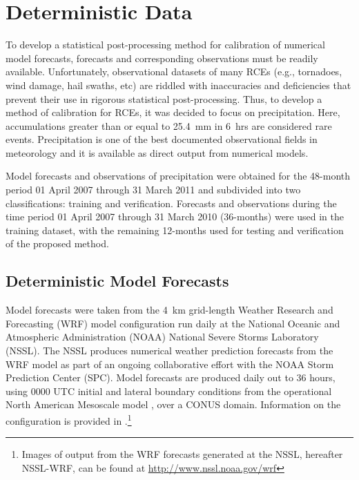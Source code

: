 

\section{Deterministic Data}
\label{ddata}

To develop a statistical post-processing method for calibration of numerical model forecasts, forecasts and corresponding observations must be readily available.
Unfortunately, observational datasets of many RCEs (e.g., tornadoes, wind damage, hail swaths, etc) are riddled with inaccuracies and deficiencies \citep{Doswell1988, Weiss2002, Trapp2006, Ortega2009} that prevent their use in rigorous statistical post-processing.
Thus, to develop a method of calibration for RCEs, it was decided to focus on precipitation.
Here, accumulations greater than or equal to \mbox{25.4 mm} in \mbox{6 hrs} are considered rare events.
Precipitation is one of the best documented observational fields in meteorology and it is available as direct output from numerical models.

Model forecasts and observations of precipitation were obtained for the 48-month period 01 April 2007 through 31 March 2011 and subdivided into two classifications: training and verification.
Forecasts and observations during the time period 01 April 2007 through 31 March 2010 (36-months) were used in the training dataset, with the remaining 12-months used for testing and verification of the proposed method.




\subsection{Deterministic Model Forecasts}
\label{dmodel}

Model forecasts were taken from the \mbox{4 km} grid-length Weather Research and Forecasting (WRF) model configuration \citep{WRFV3} run daily at the National Oceanic and Atmospheric Administration (NOAA) National Severe Storms Laboratory (NSSL).
The NSSL produces numerical weather prediction forecasts from the WRF model as part of an ongoing collaborative effort with the NOAA Storm Prediction Center (SPC).
Model forecasts are produced daily out to 36 hours, using 0000 UTC initial and lateral boundary conditions from the operational North American Mesoscale model \citep{NAM}, over a CONUS domain.
Information on the configuration is provided in \cite{Kain2010}.\footnote{Images of output from the WRF forecasts generated at the NSSL, hereafter NSSL-WRF, can be found at \url{http://www.nssl.noaa.gov/wrf}}




